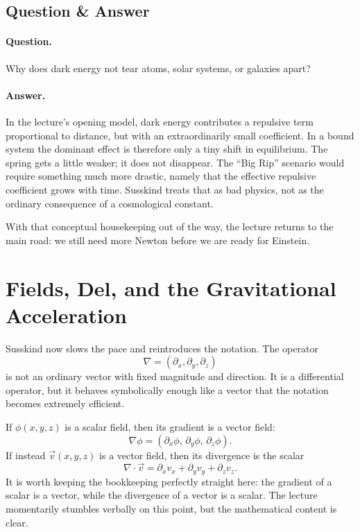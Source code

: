 \subsection{Question \& Answer}

\paragraph{Question.} Why does dark energy not tear atoms, solar systems, or galaxies apart?

\paragraph{Answer.} In the lecture's opening model, dark energy contributes a repulsive term proportional to distance, but with an extraordinarily small coefficient. In a bound system the dominant effect is therefore only a tiny shift in equilibrium. The spring gets a little weaker; it does not disappear. The ``Big Rip'' scenario would require something much more drastic, namely that the effective repulsive coefficient grows with time. Susskind treats that as bad physics, not as the ordinary consequence of a cosmological constant.

With that conceptual housekeeping out of the way, the lecture returns to the main road: we still need more Newton before we are ready for Einstein.

\section{Fields, Del, and the Gravitational Acceleration}

Susskind now slows the pace and reintroduces the notation. The operator
\begin{equation}
\nabla = (\partial_x,\partial_y,\partial_z)
\end{equation}
is not an ordinary vector with fixed magnitude and direction. It is a differential operator, but it behaves symbolically enough like a vector that the notation becomes extremely efficient.

If $\phi(x,y,z)$ is a scalar field, then its gradient is a vector field:
\begin{equation}
\nabla \phi
=
\left(
\partial_x \phi,\,
\partial_y \phi,\,
\partial_z \phi
\right).
\end{equation}
If instead $\vec v(x,y,z)$ is a vector field, then its divergence is the scalar
\begin{equation}
\nabla\cdot \vec v
=
\partial_x v_x+\partial_y v_y+\partial_z v_z.
\end{equation}
It is worth keeping the bookkeeping perfectly straight here: the gradient of a scalar is a vector, while the divergence of a vector is a scalar. The lecture momentarily stumbles verbally on this point, but the mathematical content is clear.

